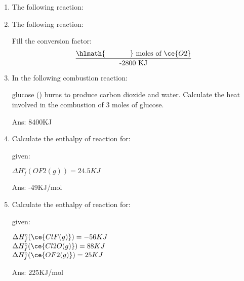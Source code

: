 \documentclass[main.tex]{subfiles}
\begin{document}
\begin{multicols*}{2}
\begin{enumerate}
\item The following reaction:
\begin{center}\end{center}
\begin{enumerate}[label=(\alph*)]
\end{enumerate}


\item The following reaction:
\begin{center}\end{center}
Fill the conversion factor:
\begin{equation*}
\frac{\hlmath{\hspace{35pt}}\text{ moles of }\ce{O2}}{\text{ -2800 KJ }} 
\end{equation*}
\item In the following combustion reaction:
\begin{center}\end{center}
glucose () burns to produce carbon dioxide and water. Calculate the heat involved in the combustion of 3 moles of glucose.
\begin{flushright}  {\small Ans: 8400KJ}\end{flushright} 

\item Calculate the enthalpy of reaction for:
\begin{center}\end{center}
given:
\begin{center}
$\Delta H^{\circ}_f(OF2(g))=24.5KJ$
\end{center}
\begin{flushright}\small Ans: -49KJ/mol\end{flushright}

\item Calculate the enthalpy of reaction for:
\begin{center}\end{center}
given:
\begin{center}
$\Delta H^{\circ}_f(\ce{ClF(g)})=-56KJ$\\
$\Delta H^{\circ}_f(\ce{Cl2O(g)})=88KJ$\\
$\Delta H^{\circ}_f(\ce{OF2(g)})=25KJ$
\end{center}
\begin{flushright}\small Ans: 225KJ/mol\end{flushright}


\end{enumerate}
\end{multicols*}
\end{document}
